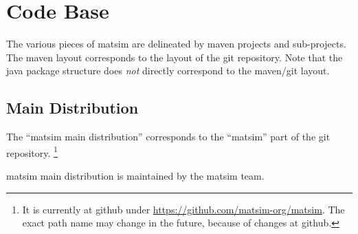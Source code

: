%
\section{Code Base}
\label{sec:core-contribs-playgrounds}
The various pieces of \gls{matsim} are delineated by \gls{maven} projects and sub-projects. 
The \gls{maven} layout corresponds to the layout of the \gls{git} repository.  
Note that the \gls{java} package structure does \emph{not} directly correspond to the \gls{maven}/\gls{git} layout.

\subsection{Main Distribution}
\label{sec:extending-main}
The ``\gls{matsim} main distribution'' corresponds to the ``matsim'' part of the \gls{git} repository.%
\footnote{
It is currently at \gls{github} under \url{https://github.com/matsim-org/matsim}. 
The exact path name may change in the future, \eg because of changes at \gls{github}.
}

\gls{matsim} main distribution is maintained by the \gls{matsim} team.

